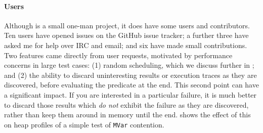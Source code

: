 \paragraph{Users}
Although \dejafu{} is a small one-man project, it does have some users
and contributors.  Ten users have opened issues on the GitHub issue
tracker; a further three have asked me for help over IRC and email;
and six have made small contributions.  Two features came directly
from user requests, motivated by performance concerns in large test
cases: (1) random scheduling, which we discuss further in
; and (2) the ability to discard uninteresting
results or execution traces as they are discovered, before evaluating
the predicate at the end.  This second point can have a significant
impact.  If you are interested in a particular failure, it is much
better to discard those results which \emph{do not} exhibit the
failure as they are discovered, rather than keep them around in memory
until the end.   shows the effect of this on heap
profiles of a simple test of \verb|MVar| contention.

